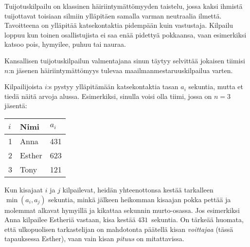 

\noindent
Tuijotuskilpailu on klassinen häiriintymättömyyden taistelu, jossa kaksi ihmistä
tuijottavat toisiaan silmiin ylläpitäen samalla varman neutraalia ilmettä.
Tavoitteena on ylläpitää katsekontaktia pidempään kuin vastustaja.
Kilpailu loppuu kun toinen osallistujista ei saa enää pidettyä pokkaansa,
vaan esimerkiksi katsoo pois, hymyilee, puhuu tai nauraa.

Kansallisen tuijotuskilpailun valmentajana sinun täytyy selvittää jokaisen 
tiimisi $n$:n jäsenen häiriintymättömyys tulevaa maailmanmestaruuskilpailua varten.

Kilpailijoista $i$:s pystyy ylläpitämään katsekontaktia tasan $a_i$ sekuntia,
mutta et tiedä näitä arvoja alussa.
Esimerkiksi, sinulla voisi olla tiimi, jossa on $n=3$ jäsentä:

\medskip
\begin{tabular}{lll}
  $i$ & Nimi & $a_i$\\\hline
  1 & Anna &  431 \\
  2 & Esther & 623 \\
  3 & Tony &  121\\
\end{tabular}

\medskip
Kun kisajaat $i$ ja $j$ kilpailevat, heidän yhteenottonsa kestää tarkalleen 
$\min(a_i, a_j)$ sekuntia, minkä jälkeen heikomman kisaajan pokka pettää 
ja molemmat alkavat hymyillä ja kikattaa sekunnin murto-osassa.
Jos esimerkiksi Anna kilpailee Estheriä vastaan, kisa kestää $431$~sekuntia.
On tärkeää huomata, että ulkopuolisen tarkastelijan on mahdotonta päätellä 
kisan \emph{voittajaa} (tässä tapauksessa Esther), vaan vain kisan 
\emph{pituus} on mitattavissa.


